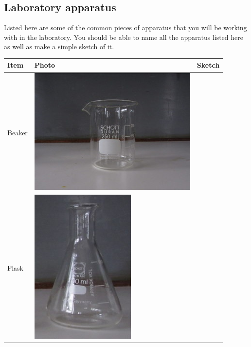 \subsection*{Laboratory apparatus}
Listed here are some of the common pieces of apparatus that you will be working with in the laboratory. You should be able to name all the apparatus listed here as well as make a simple sketch of it. 
\begin{table}[H]
 \begin{center}
  \begin{tabular}{|l|m{3cm}|m{3cm}|}\hline
   \textbf{Item} & \textbf{Photo} & \textbf{Sketch} \\ \hline
Beaker & \includegraphics[width=.2\textwidth]{photos/beaker.jpg} & \scalebox{.4}{\begin{pspicture}(0,0)(5,5) \pstTubeEssais[glassType=becher] \end{pspicture}} \\ \hline
Flask & \includegraphics[width=.05\textheight]{photos/flask.JPG} & \scalebox{.4}{\begin{pspicture}(0,0)(5,5) \pstTubeEssais[glassType=erlen] \end{pspicture}} \\ \hline

\end{tabular}
\end{center}
\end{table}
